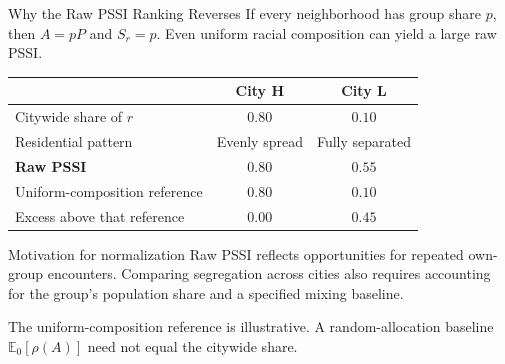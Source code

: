 \begin{frame}{Why the Raw PSSI Ranking Reverses}
\small
If every neighborhood has group share $p$, then $A=pP$ and
$S_r=p$. Even uniform racial composition can yield a large raw PSSI.
\begin{center}
\renewcommand{\arraystretch}{1.15}
\begin{tabular}{lcc}
 & \textbf{City H} & \textbf{City L} \\
\hline
Citywide share of $r$ & $0.80$ & $0.10$ \\
Residential pattern & Evenly spread & Fully separated \\
\textbf{Raw PSSI} & $\mathbf{0.80}$ & $\mathbf{0.55}$ \\
Uniform-composition reference & $0.80$ & $0.10$ \\
Excess above that reference & $0.00$ & $0.45$ \\
\hline
\end{tabular}
\end{center}
\begin{block}{Motivation for normalization}
Raw PSSI reflects opportunities for repeated own-group encounters.
Comparing segregation across cities also requires accounting for
the group's population share and a specified mixing baseline.
\end{block}
{\footnotesize The uniform-composition reference is illustrative.
A random-allocation baseline $\mathbb{E}_0[\rho(A)]$ need not equal the
citywide share.}
\end{frame}
